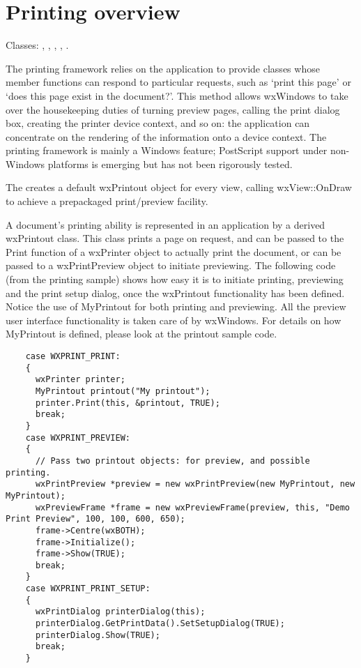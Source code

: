 \section{Printing overview}\label{printingoverview}

Classes: , ,\rtfsp
{}, ,\rtfsp
{}.

The printing framework relies on the application to provide classes
whose member functions can respond to particular requests, such
as `print this page' or `does this page exist in the document?'.
This method allows wxWindows to take over the housekeeping duties of
turning preview pages, calling the print dialog box, creating
the printer device context, and so on: the application can concentrate
on the rendering of the information onto a device context.
The printing framework is mainly a Windows feature; PostScript
support under non-Windows platforms is emerging but has not been rigorously tested.

The  creates a default wxPrintout
object for every view, calling wxView::OnDraw to achieve a
prepackaged print/preview facility.

A document's printing ability is represented in an application by a
derived wxPrintout class. This class prints a page on request, and can
be passed to the Print function of a wxPrinter object to actually print
the document, or can be passed to a wxPrintPreview object to initiate
previewing. The following code (from the printing sample) shows how easy
it is to initiate printing, previewing and the print setup dialog, once the wxPrintout
functionality has been defined. Notice the use of MyPrintout for
both printing and previewing. All the preview user interface functionality
is taken care of by wxWindows. For details on how MyPrintout is defined,
please look at the printout sample code.

\begin{verbatim}
    case WXPRINT_PRINT:
    {
      wxPrinter printer;
      MyPrintout printout("My printout");
      printer.Print(this, &printout, TRUE);
      break;
    }
    case WXPRINT_PREVIEW:
    {
      // Pass two printout objects: for preview, and possible printing.
      wxPrintPreview *preview = new wxPrintPreview(new MyPrintout, new MyPrintout);
      wxPreviewFrame *frame = new wxPreviewFrame(preview, this, "Demo Print Preview", 100, 100, 600, 650);
      frame->Centre(wxBOTH);
      frame->Initialize();
      frame->Show(TRUE);
      break;
    }
    case WXPRINT_PRINT_SETUP:
    {
      wxPrintDialog printerDialog(this);
      printerDialog.GetPrintData().SetSetupDialog(TRUE);
      printerDialog.Show(TRUE);
      break;
    }
\end{verbatim}


